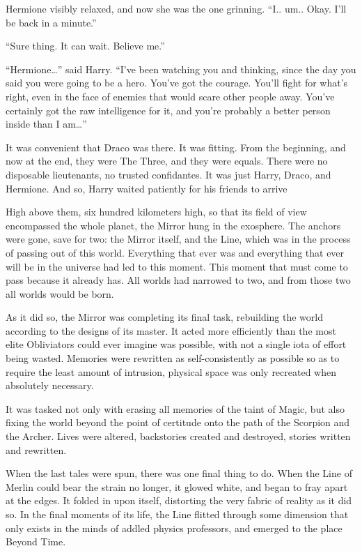 Hermione visibly relaxed, and now she was the one grinning. “I.. um.. Okay. I’ll be back in a minute.”

“Sure thing. It can wait. Believe me.”

“Hermione…” said Harry. “I’ve been watching you and thinking, since the day you said you were going to be a hero. You’ve got the courage. You’ll fight for what’s right, even in the face of enemies that would scare other people away. You’ve certainly got the raw intelligence for it, and you’re probably a better person inside than I am…”

It was convenient that Draco was there. It was fitting. From the beginning, and now at the end, they were The Three, and they were equals. There were no disposable lieutenants, no trusted confidantes. It was just Harry, Draco, and Hermione. And so, Harry waited patiently for his friends to arrive
\simpleline


High above them,  six hundred kilometers high, so that its field of view encompassed the whole planet, the Mirror hung in the exosphere. The anchors were gone, save for two: the Mirror itself, and the Line, which was in the process of passing out of this world.  Everything that ever was and everything that ever will be in the universe had led to this moment. This moment that must come to pass because it already has. All worlds had narrowed to two, and from those two all worlds would be born.

As it did so, the Mirror was completing its final task, rebuilding the world according to the designs of its master. It acted more efficiently than the most elite Obliviators could ever imagine was possible, with not a single iota of effort being wasted. Memories were rewritten as self-consistently as possible so as to require the least amount of intrusion, physical space was only recreated when absolutely necessary.

It was tasked not only with erasing all memories of the taint of Magic, but also fixing the world beyond the point of certitude onto the path of the Scorpion and the Archer. Lives were altered, backstories created and destroyed, stories written and rewritten.

When the last tales were spun, there was one final thing to do. When the Line of Merlin could bear the strain no longer, it glowed white, and began to fray apart at the edges. It folded in upon itself, distorting the very fabric of reality as it did so. In the final moments of its life, the Line flitted through some dimension that only exists in the minds of addled physics professors, and emerged to the place Beyond Time.

